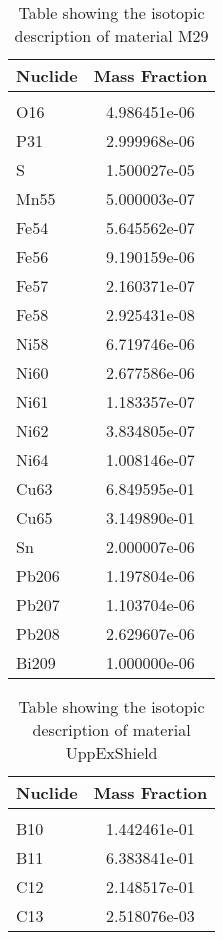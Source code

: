 \begin{centering}
\begin{table}[ht!]
\begin{tabular}{l | c}
\hline
Nuclide & Mass Fraction\\
\hline
\\
O16 & 4.986451e-06\\
P31 & 2.999968e-06\\
S & 1.500027e-05\\
Mn55 & 5.000003e-07\\
Fe54 & 5.645562e-07\\
Fe56 & 9.190159e-06\\
Fe57 & 2.160371e-07\\
Fe58 & 2.925431e-08\\
Ni58 & 6.719746e-06\\
Ni60 & 2.677586e-06\\
Ni61 & 1.183357e-07\\
Ni62 & 3.834805e-07\\
Ni64 & 1.008146e-07\\
Cu63 & 6.849595e-01\\
Cu65 & 3.149890e-01\\
Sn & 2.000007e-06\\
Pb206 & 1.197804e-06\\
Pb207 & 1.103704e-06\\
Pb208 & 2.629607e-06\\
Bi209 & 1.000000e-06
\end{tabular}
\caption{Table showing the isotopic description of material M29}
\label{table:material_M29}
\end{table}\clearpage

\begin{table}[ht!]
\begin{tabular}{l | c}
\hline
Nuclide & Mass Fraction\\
\hline
\\
B10 & 1.442461e-01\\
B11 & 6.383841e-01\\
C12 & 2.148517e-01\\
C13 & 2.518076e-03
\end{tabular}
\caption{Table showing the isotopic description of material UppExShield}
\label{table:material_UppExShield}
\end{table}\clearpage


\end{centering}
